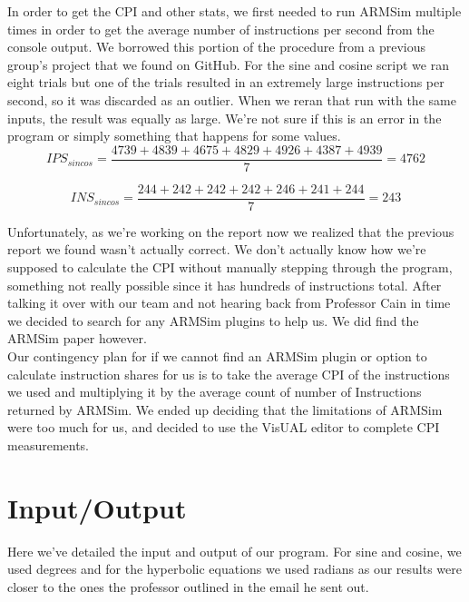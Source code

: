 \documentclass[11pt]{article}
\begin{document}
In order to get the CPI and other stats, we first needed to run ARMSim multiple times in order to get
the average number of instructions per second from the console output. We borrowed this portion of the
procedure from a previous group's project that we found on GitHub.\cite{oldreport} For the sine and
cosine script we ran eight trials but one of the trials resulted in an extremely large instructions
per second, so it was discarded as an outlier. When we reran that run with the same inputs, the result
was equally as large. We're not sure if this is an error in the program or simply something that happens
for some values.\\

\begin{equation}
    IPS_{sincos} = \frac{4739 + 4839 + 4675 + 4829 + 4926 + 4387 + 4939}{7} = 4762
\end{equation}

\begin{equation}
    INS_{sincos} = \frac{244 + 242 + 242 + 242 + 246 + 241 + 244}{7} = 243
\end{equation}

Unfortunately, as we're working on the report now we realized that the previous report we found wasn't
actually correct.\cite{oldreport} We don't actually know how we're supposed to calculate the CPI without
manually stepping through the program, something not really possible since it has hundreds of instructions
total. After talking it over with our team and not hearing back from Professor Cain in time we decided to
search for any ARMSim plugins to help us. We did find the ARMSim paper however.\cite{armsim}\\

Our contingency plan for if we cannot find an ARMSim plugin or option to calculate instruction shares for
us is to take the average CPI of the instructions we used and multiplying it by the average count of number
of Instructions returned by ARMSim. We ended up deciding that the limitations of ARMSim were too much for
us, and decided to use the VisUAL editor to complete CPI measurements.\cite{visUAL}

\section{Input/Output}

Here we've detailed the input and output of our program. For sine and cosine, we used degrees and for the
hyperbolic equations we used radians as our results were closer to the ones the professor outlined in the
email he sent out.\cite{profemailresults}
\end{document}
